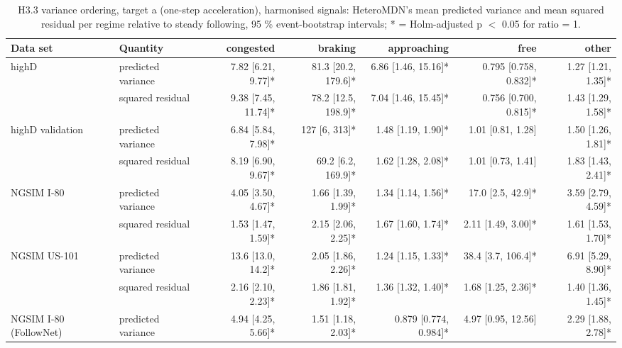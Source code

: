 \begin{table}[htbp]
\centering
\footnotesize
\caption{H3.3 variance ordering, target a (one-step acceleration), harmonised signals: HeteroMDN's mean predicted variance and mean squared residual per regime relative to steady following, 95 \% event-bootstrap intervals; * = Holm-adjusted p $<$ 0.05 for ratio = 1.}
\label{tab:t3-regime-variance--harmonised--a}
\begin{tabular}{llrrrrr}
\toprule
Data set & Quantity & congested & braking & approaching & free & other \\
\midrule
highD & predicted variance & 7.82 [6.21, 9.77]* & 81.3 [20.2, 179.6]* & 6.86 [1.46, 15.16]* & 0.795 [0.758, 0.832]* & 1.27 [1.21, 1.35]* \\
 & squared residual & 9.38 [7.45, 11.74]* & 78.2 [12.5, 198.9]* & 7.04 [1.46, 15.45]* & 0.756 [0.700, 0.815]* & 1.43 [1.29, 1.58]* \\
\midrule
highD validation & predicted variance & 6.84 [5.84, 7.98]* & 127 [6, 313]* & 1.48 [1.19, 1.90]* & 1.01 [0.81, 1.28] & 1.50 [1.26, 1.81]* \\
 & squared residual & 8.19 [6.90, 9.67]* & 69.2 [6.2, 169.9]* & 1.62 [1.28, 2.08]* & 1.01 [0.73, 1.41] & 1.83 [1.43, 2.41]* \\
\midrule
NGSIM I-80 & predicted variance & 4.05 [3.50, 4.67]* & 1.66 [1.39, 1.99]* & 1.34 [1.14, 1.56]* & 17.0 [2.5, 42.9]* & 3.59 [2.79, 4.59]* \\
 & squared residual & 1.53 [1.47, 1.59]* & 2.15 [2.06, 2.25]* & 1.67 [1.60, 1.74]* & 2.11 [1.49, 3.00]* & 1.61 [1.53, 1.70]* \\
\midrule
NGSIM US-101 & predicted variance & 13.6 [13.0, 14.2]* & 2.05 [1.86, 2.26]* & 1.24 [1.15, 1.33]* & 38.4 [3.7, 106.4]* & 6.91 [5.29, 8.90]* \\
 & squared residual & 2.16 [2.10, 2.23]* & 1.86 [1.81, 1.92]* & 1.36 [1.32, 1.40]* & 1.68 [1.25, 2.36]* & 1.40 [1.36, 1.45]* \\
\midrule
NGSIM I-80 (FollowNet) & predicted variance & 4.94 [4.25, 5.66]* & 1.51 [1.18, 2.03]* & 0.879 [0.774, 0.984]* & 4.97 [0.95, 12.56] & 2.29 [1.88, 2.78]* \\

\end{tabular}
\end{table}
